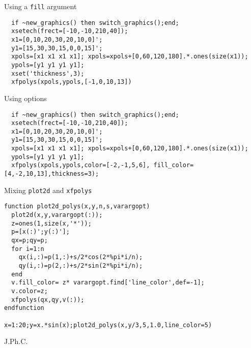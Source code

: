 \begin{examples}

\noindent Using a \verb!fill! argument
\begin{Verbatim}
  if ~new_graphics() then switch_graphics();end;
  xsetech(frect=[-10,-10,210,40]);
  x1=[0,10,20,30,20,10,0]';
  y1=[15,30,30,15,0,0,15]';
  xpols=[x1 x1 x1 x1]; xpols=xpols+[0,60,120,180].*.ones(size(x1));
  ypols=[y1 y1 y1 y1];
  xset('thickness',3);
  xfpolys(xpols,ypols,[-1,0,10,13])
\end{Verbatim}

\noindent Using options

\begin{Verbatim}
  if ~new_graphics() then switch_graphics();end;
  xsetech(frect=[-10,-10,210,40]);
  x1=[0,10,20,30,20,10,0]';
  y1=[15,30,30,15,0,0,15]';
  xpols=[x1 x1 x1 x1]; xpols=xpols+[0,60,120,180].*.ones(size(x1));
  ypols=[y1 y1 y1 y1];
  xfpolys(xpols,ypols,color=[-2,-1,5,6], fill_color=[4,-2,10,13],thickness=3);
\end{Verbatim}

\noindent Mixing \verb!plot2d! and \verb!xfpolys!

\begin{Verbatim}
function plot2d_polys(x,y,n,s,varargopt)
  plot2d(x,y,varargopt(:));
  z=ones(1,size(x,'*'));
  p=[x(:)';y(:)'];
  qx=p;qy=p;
  for i=1:n
    qx(i,:)=p(1,:)+s/2*cos(2*%pi*i/n);
    qy(i,:)=p(2,:)+s/2*sin(2*%pi*i/n);
  end
  v.fill_color= z* varargopt.find['line_color',def=-1];
  v.color=z;
  xfpolys(qx,qy,v(:));
endfunction

x=1:20;y=x.*sin(x);plot2d_polys(x,y/3,5,1.0,line_color=5)
\end{Verbatim}

\end{examples}

\begin{manseealso}
    
\end{manseealso}


\begin{authors}
  J.Ph.C.

\end{authors}

